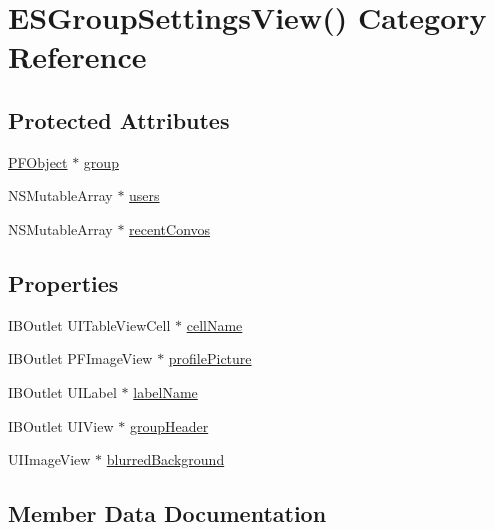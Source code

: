 \hypertarget{category_e_s_group_settings_view_07_08}{}\section{E\+S\+Group\+Settings\+View() Category Reference}
\label{category_e_s_group_settings_view_07_08}
\subsection*{Protected Attributes}
\begin{DoxyCompactItemize}
\item 
\hyperlink{interface_p_f_object}{P\+F\+Object} $\ast$ \hyperlink{category_e_s_group_settings_view_07_08_a8c86317189a4f9e6a04d40dbc94b3214}{group}
\item 
N\+S\+Mutable\+Array $\ast$ \hyperlink{category_e_s_group_settings_view_07_08_a2e3d8db1741824b6ee4c18a379b855f1}{users}
\item 
N\+S\+Mutable\+Array $\ast$ \hyperlink{category_e_s_group_settings_view_07_08_abe8301cbf71e700bf3e60a4b0fb1f35e}{recent\+Convos}
\end{DoxyCompactItemize}
\subsection*{Properties}
\begin{DoxyCompactItemize}
\item 
I\+B\+Outlet U\+I\+Table\+View\+Cell $\ast$ \hyperlink{category_e_s_group_settings_view_07_08_a87e46348254b12e096f8e18c7b65435a}{cell\+Name}
\item 
I\+B\+Outlet P\+F\+Image\+View $\ast$ \hyperlink{category_e_s_group_settings_view_07_08_a002b06f190c526e34a9debe2955f4a19}{profile\+Picture}
\item 
I\+B\+Outlet U\+I\+Label $\ast$ \hyperlink{category_e_s_group_settings_view_07_08_af9c9b0aeed690eb221a0450772472e6b}{label\+Name}
\item 
I\+B\+Outlet U\+I\+View $\ast$ \hyperlink{category_e_s_group_settings_view_07_08_a264985de394ae9e3e1fb7755e0871207}{group\+Header}
\item 
U\+I\+Image\+View $\ast$ \hyperlink{category_e_s_group_settings_view_07_08_a54aa2404914ccfdf262cf4f2c8c881c2}{blurred\+Background}
\end{DoxyCompactItemize}


\subsection{Member Data Documentation}
\hypertarget{category_e_s_group_settings_view_07_08_a8c86317189a4f9e6a04d40dbc94b3214}{}
